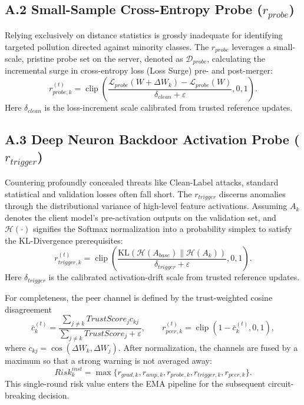 \documentclass[final,5p,times,twocolumn]{elsarticle/elsarticle}
\begin{document}
\subsection{A.2 Small-Sample Cross-Entropy Probe \texorpdfstring{($r_{probe}$)}{(r-probe)}}
Relying exclusively on distance statistics is grossly inadequate for identifying targeted pollution directed against minority classes. The $r_{probe}$ leverages a small-scale, pristine probe set on the server, denoted as $\mathcal{D}_{probe}$, calculating the incremental surge in cross-entropy loss (Loss Surge) pre- and post-merger:
\begin{equation}
    r_{probe,k}^{(t)}=\operatorname{clip}\!\left(
    \frac{\mathcal{L}_{probe}(W+\Delta W_k)-\mathcal{L}_{probe}(W)}
    {\delta_{clean}+\varepsilon},0,1\right).
\end{equation}
Here $\delta_{clean}$ is the loss-increment scale calibrated from trusted reference updates.

\subsection{A.3 Deep Neuron Backdoor Activation Probe \texorpdfstring{($r_{trigger}$)}{(r-trigger)}}
Countering profoundly concealed threats like Clean-Label attacks, standard statistical and validation losses often fall short. The $r_{trigger}$ discerns anomalies through the distributional variance of high-level feature activations. Assuming $A_k$ denotes the client model's pre-activation outputs on the validation set, and $\mathcal{H}(\cdot)$ signifies the Softmax normalization into a probability simplex to satisfy the KL-Divergence prerequisites:
\begin{equation}
    r_{trigger,k}^{(t)}=\operatorname{clip}\!\left(
    \frac{\mathrm{KL}(\mathcal{H}(A_{base})\|\mathcal{H}(A_k))}
    {\delta_{trigger}+\varepsilon},0,1\right).
\end{equation}
Here $\delta_{trigger}$ is the calibrated activation-drift scale from trusted reference updates.

For completeness, the peer channel is defined by the trust-weighted cosine disagreement
\begin{equation}
 \bar c_k^{(t)}=\frac{\sum_{j\ne k}TrustScore_j c_{kj}}
 {\sum_{j\ne k}TrustScore_j+\varepsilon},\qquad
 r_{peer,k}^{(t)}=\operatorname{clip}(1-\bar c_k^{(t)},0,1),
\end{equation}
where $c_{kj}=\cos(\Delta W_k,\Delta W_j)$. After normalization, the channels are fused by a maximum so that a strong warning is not averaged away:
\begin{equation}
 Risk_k^{inst}=\max\{r_{grad,k},r_{amp,k},r_{probe,k},r_{trigger,k},r_{peer,k}\}.
\end{equation}
This single-round risk value enters the EMA pipeline for the subsequent circuit-breaking decision.
\end{document}
